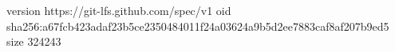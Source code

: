 version https://git-lfs.github.com/spec/v1
oid sha256:a67fcb423adaf23b5ce2350484011f24a03624a9b5d2ee7883caf8af207b9ed5
size 324243
